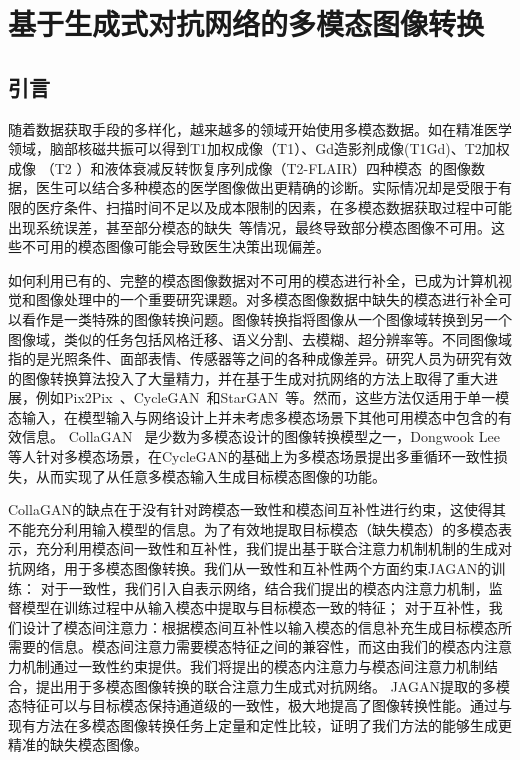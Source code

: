 \chapter{基于生成式对抗网络的多模态图像转换}

\section{引言}

随着数据获取手段的多样化，越来越多的领域开始使用多模态数据。如在精准医学领域，脑部核磁共振可以得到T1加权成像（T1）、Gd造影剂成像(T1Gd)、T2加权成像 （T2 ）和液体衰减反转恢复序列成像（T2-FLAIR）四种模态~\cite{drevelegas2011imaging}的图像数据，医生可以结合多种模态的医学图像做出更精确的诊断。实际情况却是受限于有限的医疗条件、扫描时间不足以及成本限制的因素，在多模态数据获取过程中可能出现系统误差，甚至部分模态的缺失~\cite{tanenbaum2017synthetic}等情况，最终导致部分模态图像不可用。这些不可用的模态图像可能会导致医生决策出现偏差。

如何利用已有的、完整的模态图像数据对不可用的模态进行补全，已成为计算机视觉和图像处理中的一个重要研究课题。对多模态图像数据中缺失的模态进行补全可以看作是一类特殊的图像转换问题。图像转换指将图像从一个图像域转换到另一个图像域，类似的任务包括风格迁移、语义分割、去模糊、超分辨率等。不同图像域指的是光照条件、面部表情、传感器等之间的各种成像差异。研究人员为研究有效的图像转换算法投入了大量精力，并在基于生成对抗网络的方法上取得了重大进展，例如Pix2Pix~\cite{pix2pix}、CycleGAN~\cite{cyclegan}和StarGAN~\cite{stargan}等。然而，这些方法仅适用于单一模态输入，在模型输入与网络设计上并未考虑多模态场景下其他可用模态中包含的有效信息。 CollaGAN~\cite{collagan} 是少数为多模态设计的图像转换模型之一，Dongwook Lee等人针对多模态场景，在CycleGAN的基础上为多模态场景提出多重循环一致性损失，从而实现了从任意多模态输入生成目标模态图像的功能。

CollaGAN的缺点在于没有针对跨模态一致性和模态间互补性进行约束，这使得其不能充分利用输入模型的信息。为了有效地提取目标模态（缺失模态）的多模态表示，充分利用模态间一致性和互补性，我们提出基于联合注意力机制机制的生成对抗网络，用于多模态图像转换。我们从一致性和互补性两个方面约束JAGAN的训练：
对于一致性，我们引入自表示网络，结合我们提出的模态内注意力机制，监督模型在训练过程中从输入模态中提取与目标模态一致的特征；
对于互补性，我们设计了模态间注意力：根据模态间互补性以输入模态的信息补充生成目标模态所需要的信息。模态间注意力需要模态特征之间的兼容性，而这由我们的模态内注意力机制通过一致性约束提供。我们将提出的模态内注意力与模态间注意力机制结合，提出用于多模态图像转换的联合注意力生成式对抗网络。
JAGAN提取的多模态特征可以与目标模态保持通道级的一致性，极大地提高了图像转换性能。通过与现有方法在多模态图像转换任务上定量和定性比较，证明了我们方法的能够生成更精准的缺失模态图像。

